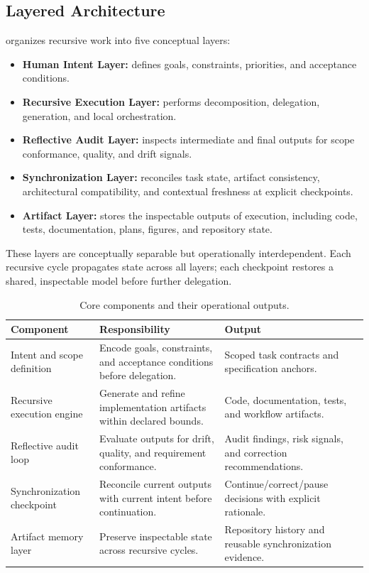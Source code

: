 \subsection{Layered Architecture}

 organizes recursive work into five conceptual layers:
\begin{itemize}
  \item \textbf{Human Intent Layer:} defines goals, constraints, priorities, and acceptance conditions.
  \item \textbf{Recursive Execution Layer:} performs decomposition, delegation, generation, and local orchestration.
  \item \textbf{Reflective Audit Layer:} inspects intermediate and final outputs for scope conformance, quality, and drift signals.
  \item \textbf{Synchronization Layer:} reconciles task state, artifact consistency, architectural compatibility, and contextual freshness at explicit checkpoints.
  \item \textbf{Artifact Layer:} stores the inspectable outputs of execution, including code, tests, documentation, plans, figures, and repository state.
\end{itemize}

These layers are conceptually separable but operationally interdependent. Each recursive cycle propagates state across all layers; each checkpoint restores a shared, inspectable model before further delegation.

\begin{table}[H]
  \centering
  \small
  \caption{Core  components and their operational outputs.}
  \label{tab:reflector-components}
  \begin{tabularx}{\linewidth}{l X X}
    \toprule
    \textbf{Component} & \textbf{Responsibility} & \textbf{Output} \\
    \midrule
    Intent and scope definition & Encode goals, constraints, and acceptance conditions before delegation. & Scoped task contracts and specification anchors. \\
    Recursive execution engine & Generate and refine implementation artifacts within declared bounds. & Code, documentation, tests, and workflow artifacts. \\
    Reflective audit loop & Evaluate outputs for drift, quality, and requirement conformance. & Audit findings, risk signals, and correction recommendations. \\
    Synchronization checkpoint & Reconcile current outputs with current intent before continuation. & Continue/correct/pause decisions with explicit rationale. \\
    Artifact memory layer & Preserve inspectable state across recursive cycles. & Repository history and reusable synchronization evidence. \\
    \bottomrule
  \end{tabularx}
\end{table}

